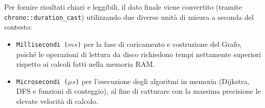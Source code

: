 \documentclass[12pt, a4paper]{article}
\begin{document}
Per fornire risultati chiari e leggibili, il dato finale viene convertito (tramite \texttt{chrono::duration\_cast}) utilizzando due diverse unità di misura a seconda del contesto:
\begin{itemize}
    \item[-] \texttt{Millisecondi ($ms$)} per la fase di caricamento e costruzione del Grafo, poiché le operazioni di lettura da disco richiedono tempi nettamente superiori rispetto ai calcoli fatti nella memoria RAM.
    \item[-] \texttt{Microsecondi ($\mu s$)} per l'esecuzione degli algoritmi in memoria (Dijkstra, DFS e funzioni di conteggio), al fine di catturare con la massima precisione le elevate velocità di calcolo.
\end{itemize}
\end{document}
